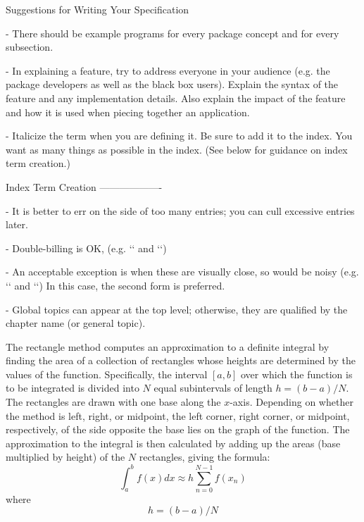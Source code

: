 \label{Rectangle_Integration}

\begin{seamlessnote}
Suggestions for Writing Your Specification

- There should be example programs for every package concept
  and for every subsection.

- In explaining a feature, try to address everyone in your audience
  (e.g. the package developers as well as the black box users).
  Explain the syntax of
  the feature and any implementation details.  Also explain the
  impact of the feature and how it is used when piecing together
  an application.

- Italicize the term when you are defining it.
  Be sure to add it to the index.  You want as many things as possible in
  the index.  (See below for guidance on index term creation.)


Index Term Creation
-------------------

 - It is better to err on the side of too many entries; you can cull excessive
   entries later.

 - Double-billing is OK, (e.g. `` and ``)

 - An acceptable exception is when these are visually close, so would be noisy
   (e.g. `` and ``)
   In this case, the second form is preferred.

 - Global topics can appear at the top level; otherwise, they are qualified by
   the chapter name (or general topic).
\end{seamlessnote}


The rectangle method computes an approximation to a 
definite integral by finding the area of a collection of rectangles whose heights are determined 
by the values of the function.  Specifically, the interval $[a,b]$ over which the function is to 
be integrated is divided into $N$ equal subintervals of length $h = (b-a)/N$. The rectangles are 
drawn with one base along the $x$-axis. Depending on whether the method is left, right, or midpoint,
the left corner, right corner, or midpoint, respectively, of the side opposite the base lies on the 
graph of the function. The approximation to the integral is 
then calculated by adding up the areas (base multiplied by height) of the $N$ rectangles, 
giving the formula:
\begin{equation}
  \int_a^b f(x) dx \approx h \sum_{n=0}^{N-1} f(x_n) \label{eq:rectangle}
\end{equation}
where
\begin{equation}
  h=(b-a)/N  \label{eq:subinterval-width}
\end{equation}

